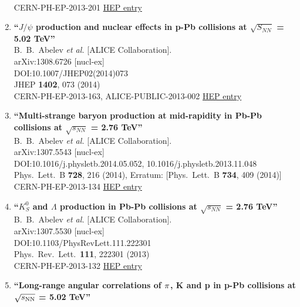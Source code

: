 \begin{enumerate}
  \\{}CERN-PH-EP-2013-201
\href{http://inspirehep.net/record/1262523}{HEP entry}
\item%
{\bf ``$J/\psi$ production and nuclear effects in p-Pb collisions at $\sqrt{S_{NN}}$ = 5.02 TeV''}
  \\{}B.~B.~Abelev {\it et al.} [ALICE Collaboration].
  \\{}arXiv:1308.6726 [nucl-ex]
  \\{}DOI:10.1007/JHEP02(2014)073
  \\{}JHEP {\bf 1402}, 073 (2014)
  \\{}CERN-PH-EP-2013-163, ALICE-PUBLIC-2013-002
\href{http://inspirehep.net/record/1251898}{HEP entry}
\item%
{\bf ``Multi-strange baryon production at mid-rapidity in Pb-Pb collisions at $\sqrt{s_{NN}}$ = 2.76 TeV''}
  \\{}B.~B.~Abelev {\it et al.} [ALICE Collaboration].
  \\{}arXiv:1307.5543 [nucl-ex]
  \\{}DOI:10.1016/j.physletb.2014.05.052, 10.1016/j.physletb.2013.11.048
  \\{}Phys.\ Lett.\ B {\bf 728}, 216 (2014), Erratum: [Phys.\ Lett.\ B {\bf 734}, 409 (2014)]
  \\{}CERN-PH-EP-2013-134
\href{http://inspirehep.net/record/1243865}{HEP entry}
\item%
{\bf ``$K^0_S$ and $\Lambda$ production in Pb-Pb collisions at $\sqrt{s_{NN}}$ = 2.76 TeV''}
  \\{}B.~B.~Abelev {\it et al.} [ALICE Collaboration].
  \\{}arXiv:1307.5530 [nucl-ex]
  \\{}DOI:10.1103/PhysRevLett.111.222301
  \\{}Phys.\ Rev.\ Lett.\  {\bf 111}, 222301 (2013)
  \\{}CERN-PH-EP-2013-132
\href{http://inspirehep.net/record/1243863}{HEP entry}
\item%
{\bf ``Long-range angular correlations of $\rm \pi$, K and p in p-Pb collisions at $\sqrt{s_{\rm NN}}$ = 5.02 TeV''}

\end{enumerate}
